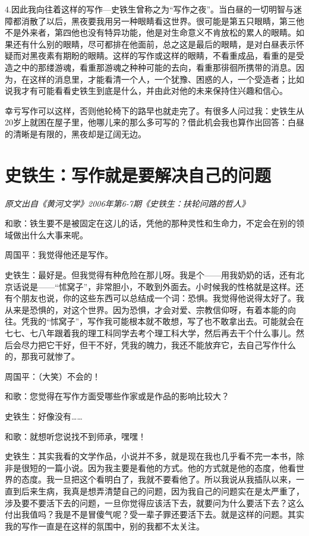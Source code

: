 \documentclass[12pt,a5paper]{ctexbook}
\begin{document}
4.因此我向往着这样的写作—史铁生曾称之为“写作之夜”。当白昼的一切明智与迷障都消散了以后，黑夜要我用另一种眼睛看这世界。很可能是第五只眼睛，第三他不是外来者，第四他也没有特异功能，他是对生命意义不肯放松的累人的眼睛。如果还有什么别的眼睛，尽可都排在他面前，总之这是最后的眼睛，是对白昼表示怀疑而对黑夜素有期盼的眼睛。这样的写作或这样的眼睛，不看重成品，看重的是受造之中的那缕游魂，看重那游魂之种种可能的去向，看重那徘徊所携带的消息。因为，在这样的消息里，才能看清一个人，一个犹豫、困惑的人，一个受造者；比如说我才有可能看看史铁生到底是什么，并由此对他的未来保持住兴趣和信心。

幸亏写作可以这样，否则他轮椅下的路早也就走完了。有很多人问过我：史铁生从20岁上就困在屋子里，他哪儿来的那么多可写的？借此机会我也算作出回答：白昼的清晰是有限的，黑夜却是辽阔无边。

\newpage

\section{史铁生：写作就是要解决自己的问题}

\emph{原文出自《黄河文学》2006年第6-7期《史铁生：扶轮问路的哲人》}
\vspace{2em}

和歌：铁生要不是被固定在这儿的话，凭他的那种灵性和生命力，不定会在别的领域做出什么大事来呢。

周国平：我觉得他还是写作。

史铁生：最好是。但我觉得有种危险在那儿呀。我是个——用我奶奶的话，还有北京话说是——“怵窝子”，非常胆小，不敢到外面去。小时候我的性格就是这样。还有个朋友也说，你的这些东西可以总结成一个词：恐惧。我觉得他说得太好了。我从来是恐惧的，对这个世界。因为恐惧，才会对爱、宗教信仰呀，有着本能的向往。凭我的“怵窝子”，写作我可能根本就不敢想，写了也不敢拿出去。可能就会在七七、七八年跟着我的理工科同学去考个理工科大学，然后再去干个什么事儿。然后会尽力把它干好，但干不好，凭我的魄力，我还不能放弃它，去自己写作什么的，那我可就惨了。

周国平：（大笑）不会的！

和歌：您觉得在写作方面受哪些作家或是作品的影响比较大？

史铁生：好像没有……

和歌：就想听您说找不到师承，嘿嘿！

史铁生：其实我看的文学作品，小说并不多，就是现在我也几乎看不完一本书，除非是很短的一篇小说。因为我主要是看他的方式。他的方式就是他的态度，他看世界的态度。我一旦把这个看明白了，我就不要看他了。所以我说从我插队以来，一直到后来生病，我真是想弄清楚自己的问题，因为我自己的问题实在是太严重了，涉及要不要活下去的问题，一旦你觉得应该活下去，就要问为什么要活下去？这么付出我值吗？我是不是冒傻气呢？受一辈子罪还要活下去。就是这样的问题。其实我的写作一直是在这样的氛围中，别的我都不太关注。
\end{document}
